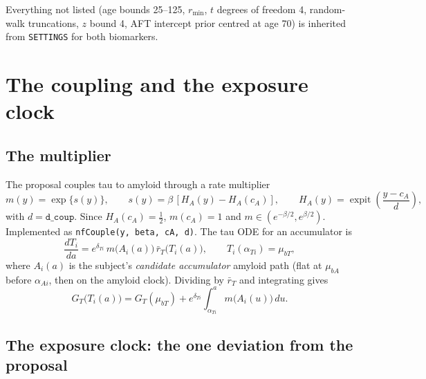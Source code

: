 \documentclass[11pt]{article}
\newcommand{\code}[1]{\texttt{#1}}
\newcommand{\rbar}{\bar r}
\newcommand{\expit}{\operatorname{expit}}
\begin{document}
Everything not listed (age bounds 25--125, $r_{\min}$, $t$ degrees of freedom 4,
random-walk truncations, $z$ bound 4, AFT intercept prior centred at age 70)
is inherited from \code{SETTINGS} for both biomarkers.

\section{The coupling and the exposure clock}\label{sec:exposure}

\subsection{The multiplier}

The proposal couples tau to amyloid through a rate multiplier
\begin{equation}
m(y)=\exp\{s(y)\},\qquad s(y)=\beta\,[H_A(y)-H_A(c_A)],\qquad
H_A(y)=\expit\!\left(\frac{y-c_A}{d}\right),
\label{eq:m}
\end{equation}
with $d=\code{d\_coup}$. Since $H_A(c_A)=\tfrac12$, $m(c_A)=1$ and
$m\in(e^{-\beta/2},e^{\beta/2})$. Implemented as \code{nfCouple(y, beta, cA, d)}.
The tau ODE for an accumulator is
\begin{equation}
\frac{dT_i}{da}=e^{\delta_{Ti}}\,m\!\big(A_i(a)\big)\,\rbar_T\!\big(T_i(a)\big),\qquad T_i(\alpha_{Ti})=\mu_{bT},
\label{eq:tauode}
\end{equation}
where $A_i(a)$ is the subject's \emph{candidate accumulator} amyloid path
(flat at $\mu_{bA}$ before $\alpha_{Ai}$, then on the amyloid clock). Dividing by
$\rbar_T$ and integrating gives
\begin{equation}
G_T\!\big(T_i(a)\big)=G_T(\mu_{bT})+e^{\delta_{Ti}}\int_{\alpha_{Ti}}^{a} m\!\big(A_i(u)\big)\,du .
\label{eq:tausol}
\end{equation}

\subsection{The exposure clock: the one deviation from the proposal}
\end{document}
